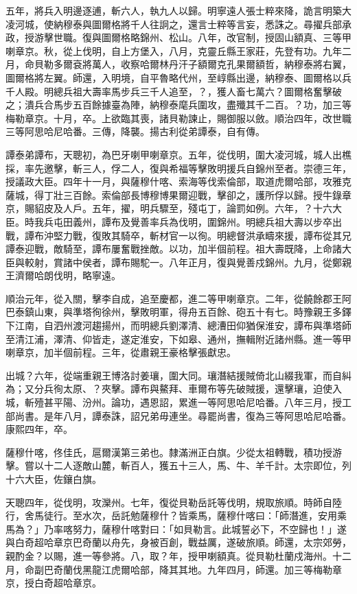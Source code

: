 \begin{pinyinscope}
五年，將兵入明邊逐逋，斬六人，執九人以歸。明寧遠人張士粹來降，詭言明築大凌河城，使納穆泰與圖爾格將千人往詗之，還言士粹等言妄，悉誅之。尋擢兵部承政，授游擊世職。復與圖爾格略錦州、松山。八年，改官制，授固山額真、三等甲喇章京。秋，從上伐明，自上方堡入，八月，克靈丘縣王家莊，先登有功。九年二月，命貝勒多爾袞將萬人，收察哈爾林丹汗子額爾克孔果爾額哲，納穆泰將右翼，圖爾格將左翼。師還，入明境，自平魯略代州，至崞縣出邊，納穆泰、圖爾格以兵千人殿。明總兵祖大壽率馬步兵三千人追至，？，獲人畜七萬六？圖爾格奮擊破之；潰兵合馬步五百餘據臺為陣，納穆泰麾兵圍攻，盡殲其千二百。？功，加三等梅勒章京。十月，卒。上欲臨其喪，諸貝勒諫止，賜御服以斂。順治四年，改世職三等阿思哈尼哈番。三傳，降襲。揚古利從弟譚泰，自有傳。

譚泰弟譚布，天聰初，為巴牙喇甲喇章京。五年，從伐明，圍大凌河城，城人出樵採，率先邀擊，斬三人，俘二人，復與希福等擊敗明援兵自錦州至者。崇德三年，授議政大臣。四年十一月，與薩穆什喀、索海等伐索倫部，取道虎爾哈部，攻雅克薩城，得丁壯三百餘。索倫部長博穆博果爾迎戰，擊卻之，護所俘以歸。授牛錄章京，賜貂皮及人戶。五年，擢，明兵驟至，殘屯丁，論罰如例。六年，？十六大臣。時我兵屯田義州，譚布及覺善率兵為伐明，圍錦州。明總兵祖大壽以步卒出戰，譚布沖堅力戰，復敗其騎卒，斬材官一以徇。明總督洪承疇來援，譚布從其兄譚泰迎戰，敵騎至，譚布屢奮戰挫敵。以功，加半個前程。祖大壽既降，上命諸大臣與較射，賞諸中侯者，譚布賜駝一。八年正月，復與覺善戍錦州。九月，從鄭親王濟爾哈朗伐明，略寧遠。

順治元年，從入關，擊李自成，追至慶都，進二等甲喇章京。二年，從饒餘郡王阿巴泰鎮山東，與準塔徇徐州，擊敗明軍，得舟五百餘、砲五十有七。時豫親王多鐸下江南，自泗州渡河趨揚州，而明總兵劉澤清、總漕田仰猶保淮安，譚布與準塔師至清江浦，澤清、仰皆走，遂定淮安，下如皋、通州，撫輯附近諸州縣。進一等甲喇章京，加半個前程。三年，從肅親王豪格擊張獻忠。

出城？六年，從端重親王博洛討姜瓖，圍大同。瓖潛結援賊倚北山綴我軍，而自糾為；又分兵徇太原、？夾擊。譚布與鰲拜、車爾布等先破賊援，還擊瓖，迫使入城，斬殪甚平陽、汾州。論功，遇恩詔，累進一等阿思哈尼哈番。八年三月，授工部尚書。是年八月，譚泰誅，詔兄弟毋連坐。尋罷尚書，復為三等阿思哈尼哈番。康熙四年，卒。

薩穆什喀，佟佳氏，扈爾漢第三弟也。隸滿洲正白旗。少從太祖轉戰，積功授游擊。嘗以十二人逐敵山麓，斬百人，獲五十三人，馬、牛、羊千計。太宗即位，列十六大臣，佐鑲白旗。

天聰四年，從伐明，攻灤州。七年，復從貝勒岳託等伐明，規取旅順。時師自陸行，舍馬徒行。至水次，岳託勉薩穆什？皆乘馬，薩穆什喀曰：「師潛進，安用乘馬為？」乃率喀努力，薩穆什喀對曰：「如貝勒言。此城誓必下，不空歸也！」遂與白奇超哈章京巴奇蘭以舟先，身被百創，戰益厲，遂破旅順。師還，太宗郊勞，親酌金？以賜，進一等參將。八，取？年，授甲喇額真。從貝勒杜蘭戍海州。十二月，命副巴奇蘭伐黑龍江虎爾哈部，降其其地。九年四月，師還。加三等梅勒章京，授白奇超哈章京。


\end{pinyinscope}
